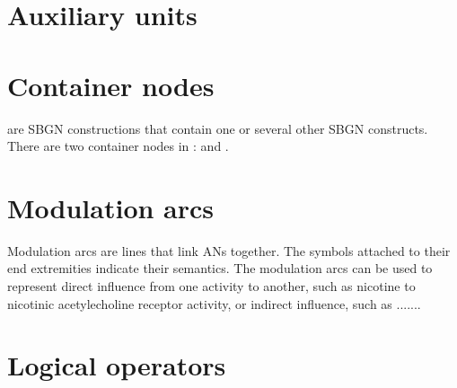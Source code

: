 




\section{Auxiliary units}\label{sec:af:AUs}




\section{Container nodes}
\label{sec:af:CNs}

 are SBGN constructions that contain one or several other SBGN constructs.  There are two container nodes in \SBGNAFLone:  and .




\section{Modulation arcs}\label{sec:af:arcs}

Modulation arcs are lines that link ANs together.  The symbols attached to their end extremities indicate their semantics.  The modulation arcs can be used to represent direct influence from one activity to another, such as nicotine to nicotinic acetylecholine receptor activity, or indirect influence, such as .......







\section{Logical operators}\label{sec:af:logic}





